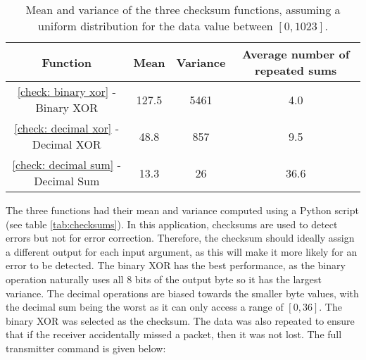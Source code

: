 \begin{table}[htb]
	\begin{center}
	\caption{Mean and variance of the three checksum functions, assuming a uniform distribution for the data value between $[0,1023]$.}
	\label{tab: checksums}
	\begin{tabular}{|c|c|c|c|}
		\hline
		\textbf{Function} & \textbf{Mean} & \textbf{Variance} & \textbf{Average number of repeated sums}\\
		\hline
		\ref{check: binary xor} - Binary XOR & 127.5 & 5461 & 4.0\\
		\ref{check: decimal xor} - Decimal XOR & 48.8 & 857 & 9.5\\
		\ref{check: decimal sum} - Decimal Sum & 13.3 & 26 & 36.6\\
		\hline
	\end{tabular}
	\end{center}
\end{table}

The three functions had their mean and variance computed using a Python script (see table \ref{tab:checksums}). In this application, checksums are used to detect errors but not for error correction. Therefore, the checksum should ideally assign a different output for each input argument, as this will make it more likely for an error to be detected. The binary XOR has the best performance, as the binary operation naturally uses all 8 bits of the output byte so it has the largest variance. The decimal operations are biased towards the smaller byte values, with the decimal sum being the worst as it can only access a range of $[0,36]$. The binary XOR was selected as the checksum. The data was also repeated to ensure that if the receiver accidentally missed a packet, then it was not lost. The full transmitter command is given below:


